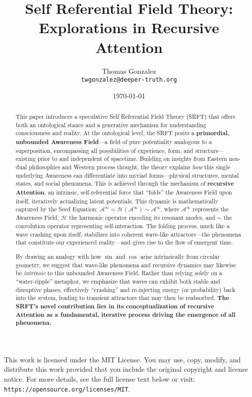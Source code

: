 \documentclass[12pt,a4paper]{article}
\title{\textbf{Self Referential Field Theory:\\
Explorations in Recursive Attention}}
\author{%
  Thomas Gonzalez \\
  \small \texttt{twgonzalez@deeper-truth.org}
}
\date{\today}
\begin{document}
\maketitle

\vfill
\noindent\hrulefill
\medskip

\noindent 
This work is licensed under the MIT License. You may use, copy, modify, and distribute this work provided that you include the original copyright and license notice.  For more details, see the full license text below or visit: \texttt{https://opensource.org/licenses/MIT}.
\medskip \\

\newpage

\begin{abstract}
This paper introduces a speculative Self Referential Field Theory (SRFT) that offers both an ontological stance and a generative mechanism for understanding consciousness and reality. At the ontological level, the SRFT posits a \textbf{primordial, unbounded Awareness Field}---a field of pure potentiality analogous to a superposition, encompassing all possibilities of experience, form, and structure---existing prior to and independent of spacetime. Building on insights from Eastern non-dual philosophies and Western process thought, the theory explains \emph{how} this single underlying Awareness can differentiate into myriad forms—physical structures, mental states, and social phenomena. This is achieved through the mechanism of \textbf{recursive Attention}, an intrinsic, self-referential force that ``folds'' the Awareness Field upon itself, iteratively actualizing latent potentials. This dynamic is mathematically captured by the Seed Equation: \(\mathscr{A}^\infty = \mathcal{H}(\mathscr{A}^\infty) \sim \mathscr{A}^\infty\), where \(\mathscr{A}^\infty\) represents the Awareness Field, \(\mathcal{H}\) the harmonic operator encoding its resonant modes, and \(\sim\) the convolution operator representing self-interaction. The folding process, much like a wave crashing upon itself, stabilizes into coherent wave-like attractors---the phenomena that constitute our experienced reality---and gives rise to the flow of emergent time.

By drawing an analogy with how \( \sin \) and \( \cos \) arise intrinsically from circular geometry, we suggest that wave-like phenomena and recursive dynamics may likewise be \emph{intrinsic} to this unbounded Awareness Field. Rather than relying solely on a “water-ripple” metaphor, we emphasize that waves can exhibit both stable and disruptive phases, effectively “crashing” and re-injecting energy (or probability) back into the system, leading to transient attractors that may then be reabsorbed. \textbf{The SRFT's novel contribution lies in its conceptualization of recursive Attention as a fundamental, iterative process driving the emergence of all phenomena.}


\end{abstract}
\end{document}
